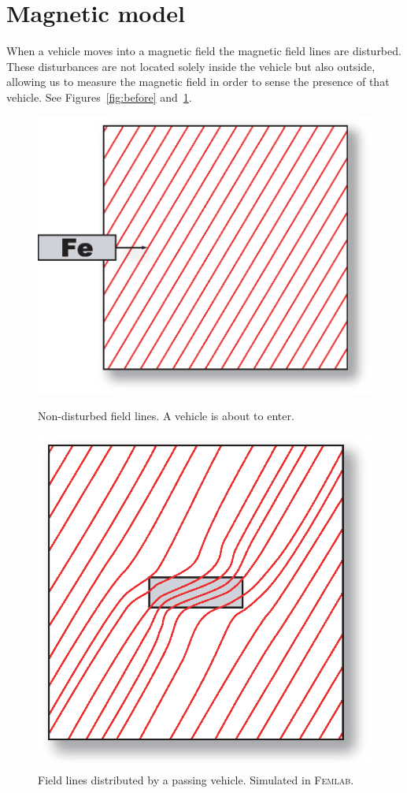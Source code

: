 \section{Magnetic model}

When a vehicle moves into a magnetic field the magnetic field lines are disturbed. These disturbances are not located solely inside the vehicle but also outside, allowing us to measure the magnetic field in order to sense the presence of that vehicle. See Figures~\ref{fig:before} and~\ref{fig:after}.
\begin{subfigures}
\begin{figure}[!th]
 \centering
 \begin{minipage}{0.45\linewidth}
 \centering
 	\includegraphics[height=5 cm]{images/before}
  	\caption[Non-disturbed field lines]{Non-disturbed field lines. A vehicle is about to enter.}
  	\label{fig:before} 
 \end{minipage} \hfill
 \begin{minipage}{0.45\linewidth}
 \centering
 	
  	\includegraphics[height=5 cm]{images/after}
  	\caption[Field lines distributed by a vehicle]{Field lines distributed by a passing vehicle. Simulated in \textsc{Femlab}\footnotemark.}
  	\label{fig:after}
 \end{minipage}
  \end{figure}
 \end{subfigures}

%  

